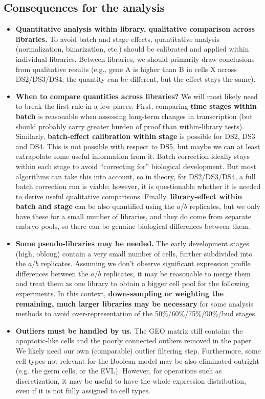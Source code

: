 \documentclass[11pt,a4paper]{article}
\begin{document}
\subsection{Consequences for the analysis}

\begin{itemize}
	\item \textbf{Quantitative analysis within library, qualitative comparison across libraries.} To avoid batch and stage effects, quantitative analysis (normalization, binarization, etc.) should be calibrated and applied within individual libraries. Between libraries, we should primarily draw conclusions from qualitative results (e.g., gene A is higher than B in cells X across DS2/DS3/DS4; the quantity can be different, but the effect stays the same). 
	\item \textbf{When to compare quantities across libraries?} We will most likely need to break the first rule in a few places. First, comparing \textbf{time stages within batch} is reasonable when assessing long-term changes in transcription (but should probably carry greater burden of proof than within-library tests). Similarly, \textbf{batch-effect calibration within stage} is possible for DS2, DS3 and DS4. This is not possible with respect to DS5, but maybe we can at least extrapolate some useful information from it. Batch correction ideally stays within each stage to avoid ``correcting for'' biological development. But most algorithms can take this into account, so in theory, for DS2/DS3/DS4, a full batch correction run is viable; however, it is questionable whether it is needed to derive useful qualitative comparisons. Finally, \textbf{library-effect within batch and stage} can be also quantified using the $a$/$b$ replicates, but we only have these for a small number of libraries, and they do come from separate embryo pools, so there can be genuine biological differences between them.
	\item \textbf{Some pseudo-libraries may be needed.} The early development stages (high, oblong) contain a very small number of cells, further subdivided into the $a$/$b$ replicates. Assuming we don't observe significant expression profile differences between the $a$/$b$ replicates, it may be reasonable to merge them and treat them as one library to obtain a bigger cell pool for the following experiments. In this context, \textbf{down-sampling or weighting the remaining, much larger libraries may be necessary} for some analysis methods to avoid over-representation of the 50\%/60\%/75\%/90\%/bud stages.
	\item \textbf{Outliers must be handled by us.} The GEO matrix still contains the apoptotic-like cells and the poorly connected outliers removed in the paper. We likely need our own (comparable) outlier filtering step. Furthermore, some cell types not relevant for the Boolean model may be also eliminated outright (e.g. the germ cells, or the EVL). However, for operations such as discretization, it may be useful to have the whole expression distribution, even if it is not fully assigned to cell types.
\end{itemize}
\end{document}
